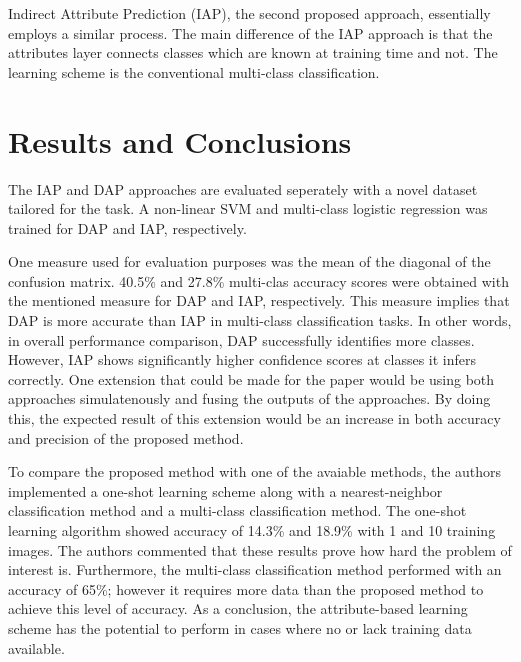 \documentclass[11pt]{article}
\begin{document}
Indirect Attribute Prediction (IAP), the second proposed approach, essentially employs a similar process.
The main difference of the IAP approach is that the attributes layer connects classes which are known at training time and not.
The learning scheme is the conventional multi-class classification.

\section*{Results and Conclusions}
The IAP and DAP approaches are evaluated seperately with a novel dataset tailored for the task.
A non-linear SVM and multi-class logistic regression was trained for DAP and IAP, respectively.

One measure used for evaluation purposes was the mean of the diagonal of the confusion matrix.
40.5\% and 27.8\% multi-clas accuracy scores were obtained with the mentioned measure for DAP and IAP, respectively.
This measure implies that DAP is more accurate than IAP in multi-class classification tasks.
In other words, in overall performance comparison, DAP successfully identifies more classes.
However, IAP shows significantly higher confidence scores at classes it infers correctly.
One extension that could be made for the paper would be using both approaches simulatenously and fusing the outputs of the approaches.
By doing this, the expected result of this extension would be an increase in both accuracy and precision of the proposed method.

To compare the proposed method with one of the avaiable methods, the authors implemented a one-shot learning scheme along with a nearest-neighbor classification method and a multi-class classification method.
The one-shot learning algorithm showed accuracy of 14.3\% and 18.9\% with 1 and 10 training images.
The authors commented that these results prove how hard the problem of interest is.
Furthermore, the multi-class classification method performed with an accuracy of 65\%; however it requires more data than the proposed method to achieve this level of accuracy.
As a conclusion, the attribute-based learning scheme has the potential to perform in cases where no or lack training data available.
% 
% 
\end{document}

